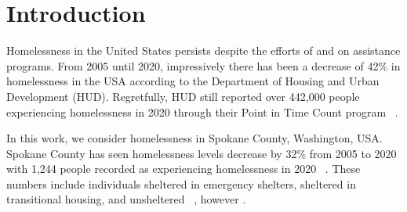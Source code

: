 \documentclass[10pt,letterpaper]{article}
\newcommand{\red}[1]{{\color{red}{#1}}}
\begin{document}



\section*{Introduction}

Homelessness in the United States persists despite the efforts of \red{PROGRAMS} and \red{MONEY, MONEY spent each year} on assistance programs.  From 2005 until 2020, impressively there has been a decrease of 42\% in homelessness in the USA according to the Department of Housing and Urban Development (HUD).  Regretfully, HUD still reported over 442,000 people experiencing homelessness in 2020 through their Point in Time Count program ~\cite{PITcount}.   \red{ Is there data that shows a rise in homelessness?  Or a recent rise in light of the pandemic???}

In this work, we consider homelessness in Spokane County, Washington, USA.  Spokane County has seen  homelessness levels decrease by 32\% from 2005 to 2020 with 1,244 people recorded as experiencing homelessness in 2020 ~\cite{PITcount}. These numbers include individuals sheltered in emergency shelters, sheltered in transitional housing, and unsheltered ~\cite{PITcount}, however \red{some fear PIT counts far underestimate homeless numbers*****}.  

\end{document}
